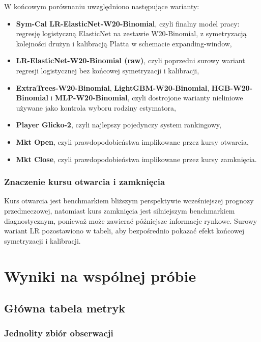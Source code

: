 W końcowym porównaniu uwzględniono następujące warianty:

\begin{itemize}
    \item \textbf{Sym-Cal LR-ElasticNet-W20-Binomial}, czyli finalny model pracy: regresję
          logistyczną ElasticNet na zestawie W20-Binomial, z symetryzacją kolejności drużyn
          i kalibracją Platta w schemacie expanding-window,
    \item \textbf{LR-ElasticNet-W20-Binomial (raw)}, czyli poprzedni surowy wariant regresji
          logistycznej bez końcowej symetryzacji i kalibracji,
    \item \textbf{ExtraTrees-W20-Binomial}, \textbf{LightGBM-W20-Binomial},
          \textbf{HGB-W20-Binomial} i \textbf{MLP-W20-Binomial}, czyli dostrojone warianty
          nieliniowe używane jako kontrola wyboru rodziny estymatora,
    \item \textbf{Player Glicko-2}, czyli najlepszy pojedynczy system rankingowy,
    \item \textbf{Mkt Open}, czyli prawdopodobieństwa implikowane przez kursy otwarcia,
    \item \textbf{Mkt Close}, czyli prawdopodobieństwa implikowane przez kursy zamknięcia.
\end{itemize}

\subsubsection{Znaczenie kursu otwarcia i zamknięcia}

Kurs otwarcia jest benchmarkiem bliższym perspektywie wcześniejszej prognozy przedmeczowej,
natomiast kurs zamknięcia jest silniejszym benchmarkiem diagnostycznym, ponieważ może zawierać
późniejsze informacje rynkowe. Surowy wariant LR pozostawiono w tabeli, aby bezpośrednio pokazać
efekt końcowej symetryzacji i kalibracji.

\section{Wyniki na wspólnej próbie}

\subsection{Główna tabela metryk}

\subsubsection{Jednolity zbiór obserwacji}

